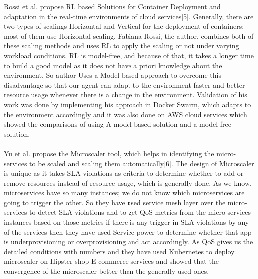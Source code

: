 \documentclass[conference]{IEEEtran}
\begin{document}
Rossi et al. propose RL based Solutions for Container Deployment and adaptation in the real-time environments of cloud services[5]. Generally, there are two types of scalings Horizontal and Vertical for the deployment of containers; most of them use Horizontal scaling. Fabiana Rossi, the author, combines both of these scaling methods and uses RL to apply the scaling or not under varying workload conditions. RL is model-free, and because of that, it takes a longer time to build a good model as it does not have a priori knowledge about the environment. So author Uses a Model-based approach to overcome this disadvantage so that our agent can adapt to the environment faster and better resource usage whenever there is a change in the environment. Validation of his work was done by implementing his approach in Docker Swarm, which adapts to the environment accordingly and it was also done on AWS cloud services which showed the comparisons of using A model-based solution and a model-free solution.  \\ \\

Yu et al. propose the Microscaler tool, which helps in identifying the micro-services to be scaled and scaling them automatically[6]. The design of Microscaler is unique as it takes SLA violations as criteria to determine whether to add or remove resources instead of resource usage, which is generally done. As we know, microservices have so many instances; we do not know which microservices are going to trigger the other. So they have used service mesh layer over the micro-services to detect SLA violations and to get QoS metrics from the micro-services instances based on those metrics if there is any trigger in SLA violations by any of the services then they have used Service power to determine whether that app is underprovisioning or overprovisioning and act accordingly. As QoS gives us the detailed conditions with numbers and they have used Kubernetes to deploy microscaler on Hipster shop E-commerce services and showed that the convergence of the microscaler better than the generally used ones. \\ \\
\end{document}

